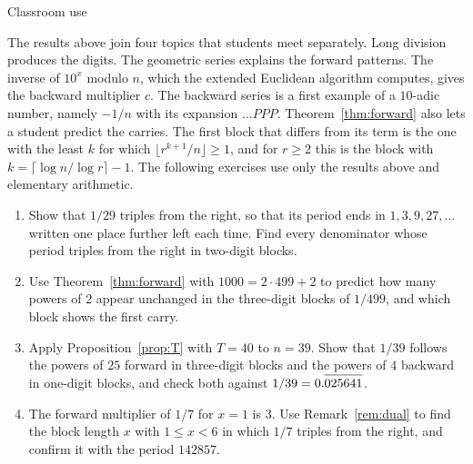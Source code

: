 \documentclass[11pt,a4paper]{amsart}
\makeatletter
\newcommand{\rep}[1]{\overline{\rule{0pt}{1.95ex}#1}}
\def\section{\@startsection{section}{1}%
  \z@{-.7\linespacing\@plus-\linespacing}{.5\linespacing}%
  {\normalfont\scshape\centering}}
\theoremstyle{definition}
\theoremstyle{remark}
\makeatother
\begin{document}
\section{Classroom use}\label{sec:classroom}

The results above join four topics that students meet separately. Long division produces the digits. The geometric series explains the forward patterns. The inverse of $10^x$ modulo $n$, which the extended Euclidean algorithm computes, gives the backward multiplier $c$. The backward series is a first example of a $10$-adic number, namely $-1/n$ with its expansion $\dots PPP$. Theorem~\ref{thm:forward} also lets a student predict the carries. The first block that differs from its term is the one with the least $k$ for which $\lfloor r^{k+1}/n \rfloor \ge 1$, and for $r \ge 2$ this is the block with $k = \lceil \log n/\log r \rceil - 1$. The following exercises use only the results above and elementary arithmetic.

\begin{enumerate}
\item Show that $1/29$ triples from the right, so that its period ends in
  $1, 3, 9, 27, \dots$ written one place further left each time. Find every
  denominator whose period triples from the right in two-digit blocks.
\item Use Theorem~\ref{thm:forward} with $1000 = 2\cdot 499 + 2$ to predict how many powers of $2$ appear unchanged in the three-digit blocks of $1/499$, and which block shows the first carry.
\item Apply Proposition~\ref{prop:T} with $T = 40$ to $n = 39$. Show that
  $1/39$ follows the powers of $25$ forward in three-digit blocks and the
  powers of $4$ backward in one-digit blocks, and check both against
  $1/39 = 0.\rep{025641}$.
\item The forward multiplier of $1/7$ for $x = 1$ is $3$. Use Remark~\ref{rem:dual} to find the block length $x$ with $1 \le x < 6$ in which $1/7$ triples from the right, and confirm it with the period $142857$.
\end{enumerate}
\end{document}

